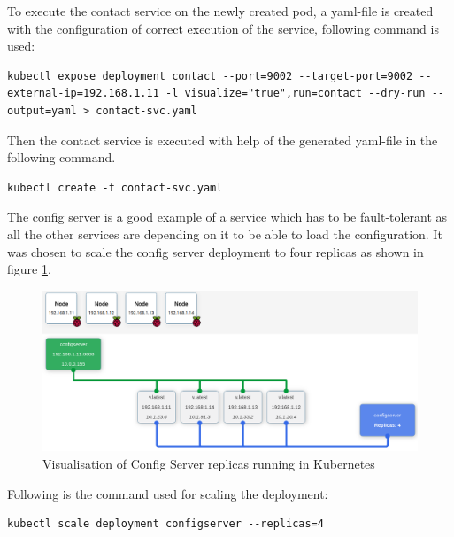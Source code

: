 To execute the contact service on the newly created pod, a yaml-file is created with the configuration of correct execution of the service, following command is used:
\begin{lstlisting}[frame=single, ]
kubectl expose deployment contact --port=9002 --target-port=9002 --external-ip=192.168.1.11 -l visualize="true",run=contact --dry-run --output=yaml > contact-svc.yaml
\end{lstlisting}

Then the contact service is executed with help of the generated yaml-file in the following command.
\begin{lstlisting}[frame=single, ]
kubectl create -f contact-svc.yaml
\end{lstlisting}

The config server is a good example of a service which has to be fault-tolerant as all the other services are depending on it to be able to load the configuration. It was chosen to scale the config server deployment to four replicas as shown in figure \ref{fig:configserver-visual}. 
\begin{figure}[bth]
	\centering 
	\includegraphics[width=1\linewidth]{gfx/configServer4Replicas}
	\caption[configserver]{Visualisation of Config Server replicas running in Kubernetes} \label{fig:configserver-visual}
\end{figure}
Following is the command used for scaling the deployment:
\begin{lstlisting}[frame=single, ]
kubectl scale deployment configserver --replicas=4
\end{lstlisting}

